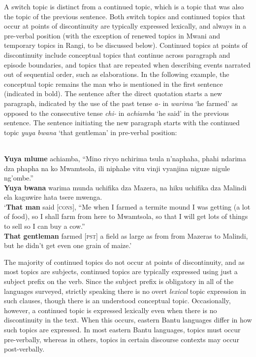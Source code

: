 \documentclass[output=paper]{langsci/langscibook}
\begin{document}
A switch topic is distinct from a continued topic, which is a topic that was also the topic of the previous sentence. Both switch topics and continued topics that occur at points of discontinuity are typically expressed lexically, and always in a pre-verbal position (with the exception of renewed topics in Mwani and temporary topics in Rangi, to be discussed below). Continued topics at points of discontinuity include conceptual topics that continue across paragraph and episode boundaries, and topics that are repeated when describing events narrated out of sequential order, such as elaborations. In the following example, the conceptual topic remains the man who is mentioned in the first sentence (indicated in bold). The sentence after the direct quotation starts a new paragraph, indicated by the use of the past tense \textit{a-} in \textit{warima} ‘he farmed’ as opposed to the consecutive tense \textit{chi-} in \textit{achiamba} ‘he said’ in the previous sentence. The sentence initiating the new paragraph starts with the continued topic \textit{yuya bwana} ‘that gentleman’ in pre-verbal position:

\ea\label{ex:8.nicolle}
\\
  \textbf{Yuya mlume} achiamba, “Mino rivyo nchirima tsula n’naphaha, phahi ndarima dza phapha na ko Mwamtsola, ili niphahe vitu vinji vyanjina niguze nigule ng'ombe.”\\  \textbf{Yuya bwana} warima munda uchifika dza Mazera, na hiku uchifika dza Malindi ela kaguwire hata tsere mwenga.\\
\glt `\textbf{That man} said [\textsc{cons}], “Me when I farmed a termite mound I was getting (a lot of food), so I shall farm from here to Mwamtsola, so that I will get lots of things to sell so I can buy a cow.” \\

\textbf{That gentleman} farmed [\textsc{pst}] a field as large as from from Mazeras to Malindi, but he didn’t get even one grain of maize.’
\z

The majority of continued topics do not occur at points of discontinuity, and as most topics are subjects, continued topics are typically expressed using just a subject prefix on the verb. Since the subject prefix is obligatory in all of the languages surveyed, strictly speaking there is no overt \textit{lexical} topic expression in such clauses, though there is an understood conceptual topic. Occasionally, however, a continued topic is expressed lexically even when there is no discontinuity in the text. When this occurs, eastern Bantu languages differ in how such topics are expressed. In most eastern Bantu languages, topics must occur pre-verbally, whereas in others, topics in certain discourse contexts may occur post-verbally.
\end{document}
